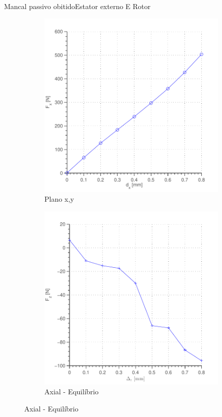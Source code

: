 \documentclass{beamer}
\begin{document}
\begin{frame}{Mancal passivo obitido}{Estator externo E Rotor}
\begin{figure}
\begin{subfigure}{.5\textwidth}
	\includegraphics[width=1\linewidth]{Simulacoes/Passivo2/fem/passivo_otimizado_fem_dx}
	\caption{Plano x,y}
\end{subfigure}%
\begin{subfigure}{.5\textwidth}	
	\includegraphics[width=1 \linewidth,angle=0]{Simulacoes/Passivo2/fem/passivo_otimizado_fem_dy}
	\caption*{Axial - Equilíbrio}
\end{subfigure}%

\end{figure}
\end{frame}
\end{document}
